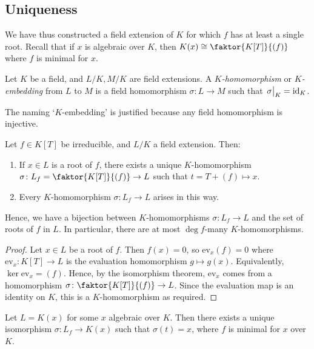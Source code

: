 \subsection{Uniqueness}
We have thus constructed a field extension of \( K \) for which \( f \) has at least a single root.
Recall that if \( x \) is algebraic over \( K \), then \( K(x) \cong \faktor{K[T]}{(f)} \) where \( f \) is minimal for \( x \).
\begin{definition}
	Let \( K \) be a field, and \( L / K, M / K \) are field extensions.
	A \emph{\( K \)-homomorphism} or \emph{\( K \)-embedding} from \( L \) to \( M \) is a field homomorphism \( \sigma \colon L \to M \) such that \( \eval{\sigma}_K = \mathrm{id}_K \).
\end{definition}
The naming `\( K \)-embedding' is justified because any field homomorphism is injective.
\begin{theorem}
	Let \( f \in K[T] \) be irreducible, and \( L / K \) a field extension.
	Then:
	\begin{enumerate}
		\item If \( x \in L \) is a root of \( f \), there exists a unique \( K \)-homomorphism \( \sigma \colon L_f = \faktor{K[T]}{(f)} \to L \) such that \( t = T + (f) \mapsto x \).
		\item Every \( K \)-homomorphism \( \sigma \colon L_f \to L \) arises in this way.
	\end{enumerate}
	Hence, we have a bijection between \( K \)-homomorphisms \( \sigma \colon L_f \to L \) and the set of roots of \( f \) in \( L \).
	In particular, there are at most \( \deg f \)-many \( K \)-homomorphisms.
\end{theorem}
\begin{proof}
	Let \( x \in L \) be a root of \( f \).
	Then \( f(x) = 0 \), so \( \mathrm{ev}_x(f) = 0 \) where \( \mathrm{ev}_x \colon K[T] \to L \) is the evaluation homomorphism \( g \mapsto g(x) \).
	Equivalently, \( \ker \mathrm{ev}_x = (f) \).
	Hence, by the isomorphism theorem, \( \mathrm{ev}_x \) comes from a homomorphism \( \sigma \colon \faktor{K[T]}{(f)} \to L \).
	Since the evaluation map is an identity on \( K \), this is a \( K \)-homomorphism as required.
\end{proof}
\begin{corollary}
	Let \( L = K(x) \) for some \( x \) algebraic over \( K \).
	Then there exists a unique isomorphism \( \sigma \colon L_f \to K(x) \) such that \( \sigma(t) = x \), where \( f \) is minimal for \( x \) over \( K \).
\end{corollary}
